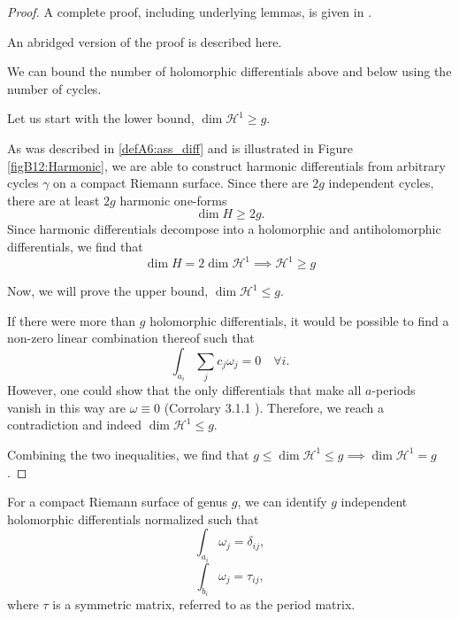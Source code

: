 \begin{proof}
    A complete proof, including underlying lemmas, is given in \cite{Ber06}.

    An abridged version of the proof is described here.

    We can bound the number of holomorphic differentials above and below using the number of cycles.

    Let us start with the lower bound, $\dim \mathcal H^1 \geq g$.

    As was described in \ref{defA6:ass_diff} and is illustrated in Figure \ref{figB12:Harmonic}, we are able to construct harmonic differentials from arbitrary cycles $\gamma$ on a compact Riemann surface. Since there are $2g$ independent cycles, there are at least $2g$ harmonic one-forms
    \begin{equation}
        \dim H \geq 2g.
    \end{equation}
    Since harmonic differentials decompose into a holomorphic and antiholomorphic differentials, we find that
    \begin{equation}
        \dim H = 2 \dim \mathcal H^1 \implies \mathcal H^1 \geq g
    \end{equation}

    Now, we will prove the upper bound, $\dim \mathcal H^1 \leq g$.

    If there were more than $g$ holomorphic differentials, it would be possible to find a non-zero linear combination thereof such that
    \begin{equation}
        \int_{a_i} \sum_j c_j \omega_j = 0 \quad \forall i.
    \end{equation}
    However, one could show that the only differentials that make all $a$-periods vanish in this way are $\omega \equiv 0$ (Corrolary 3.1.1 \cite{Ber06}). Therefore, we reach a contradiction and indeed $\dim \mathcal H^1 \leq g$. 

    Combining the two inequalities, we find that $g \leq \dim \mathcal H^1 \leq g \implies \dim \mathcal H^1 = g$.
\end{proof}

\begin{lemma}
    For a compact Riemann surface of genus $g$, we can identify $g$ independent holomorphic differentials normalized such that
    \begin{equation}
        \int_{a_i} \omega_j = \delta_{ij},
    \end{equation}
    \begin{equation}
        \int_{b_i} \omega_j = \tau_{ij},
    \end{equation}
    where $\tau$ is a symmetric matrix, referred to as the period matrix.
\end{lemma}


